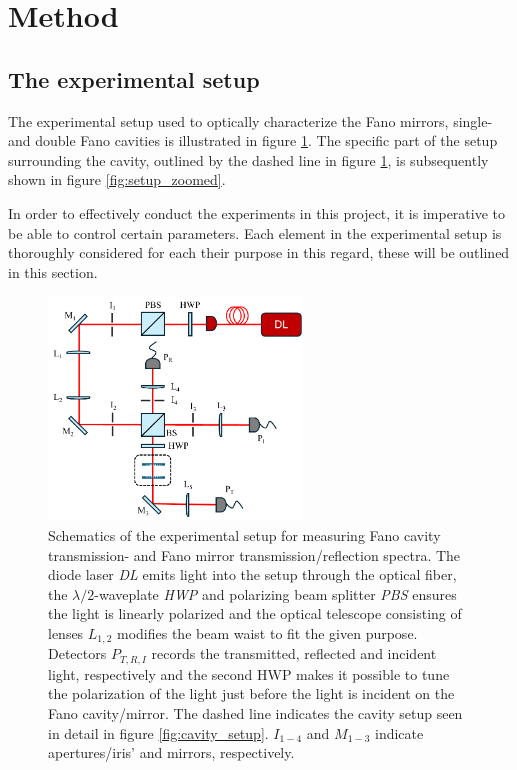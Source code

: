 \section{Method}
\subsection{The experimental setup}

The experimental setup used to optically characterize the Fano mirrors, single- and double Fano cavities is illustrated in figure \ref{fig:setup_sketch}. The specific part of the setup surrounding the cavity, outlined by the dashed line in figure \ref{fig:setup_sketch}, is subsequently shown in figure \ref{fig:setup_zoomed}. 

In order to effectively conduct the experiments in this project, it is imperative to be able to control certain parameters. Each element in the experimental setup is thoroughly considered for each their purpose in this regard, these will be outlined in this section. 

\begin{figure}[h!]
    \centering
    \includegraphics[width=0.6\textwidth]{figures/setup_sketch.pdf}
    \caption{Schematics of the experimental setup for measuring Fano cavity transmission- and Fano mirror transmission/reflection spectra. The diode laser \emph{DL} emits light into the setup through the optical fiber, the $\lambda/2$-waveplate \emph{HWP} and polarizing beam splitter \emph{PBS} ensures the light is linearly polarized and the optical telescope consisting of lenses $L_{1,2}$ modifies the beam waist to fit the given purpose. Detectors $P_{T,R,I}$ records the transmitted, reflected and incident light, respectively and the second HWP makes it possible to tune the polarization of the light just before the light is incident on the Fano cavity/mirror. The dashed line indicates the cavity setup seen in detail in figure \ref{fig:cavity_setup}. $I_{1-4}$ and $M_{1-3}$ indicate apertures/iris' and mirrors, respectively.}
    \label{fig:setup_sketch}
\end{figure}

